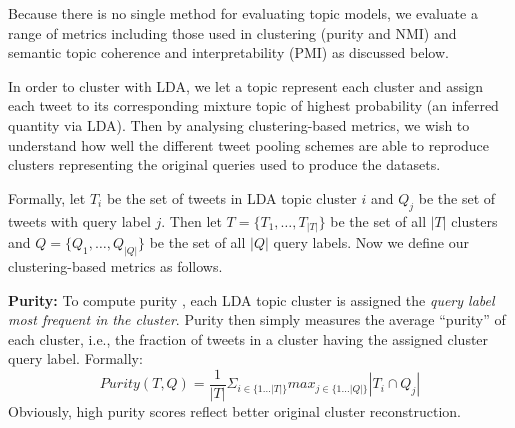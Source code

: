 \documentclass{sig-alternate}
\begin{document}

Because there is no single method for evaluating topic models, we
evaluate a range of metrics including those used in clustering (purity
and NMI) and semantic topic coherence and interpretability (PMI)
as discussed below.

In order to cluster with LDA, we let a topic represent each cluster
and assign each tweet to its corresponding mixture topic of highest
probability (an inferred quantity via LDA).  Then by analysing
clustering-based metrics, we wish to understand how well the different
tweet pooling schemes are able to reproduce clusters representing the
original queries used to produce the datasets.  

Formally, let $T_{i}$ be the set of tweets in LDA topic cluster $i$ and
$Q_{j}$ be the set of tweets with query label $j$.  Then let $T = \lbrace
T_{1}, \ldots , T_{|T|} \rbrace$ be the set of all $|T|$ clusters and $Q =
\lbrace Q_{1}, \ldots , Q_{|Q|} \rbrace$ be the set of all $|Q|$
query labels.  Now we define our clustering-based metrics as follows.

\vspace{1mm} \noindent \textbf{Purity:} To compute purity \cite{MRS08}, each LDA
topic cluster is assigned the \emph{query label most frequent in the
cluster}.  Purity then simply measures the average ``purity'' of each
cluster, i.e., the fraction of tweets in a cluster having the assigned
cluster query label.  Formally:
\[
 \mathit{Purity}(T,Q) = \frac{1}{|T|} \Sigma_{i \in \{ 1\ldots|T|\} } max_{j \in \{1\ldots|Q| \} } |T_{i} \cap Q_{j}|
\]
Obviously, high purity scores reflect better original cluster
reconstruction.
\end{document}
